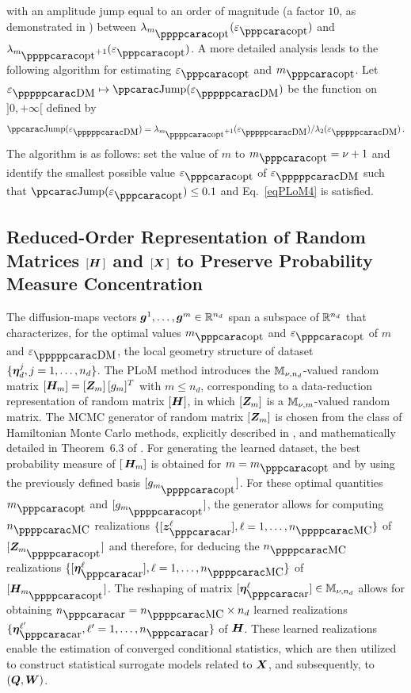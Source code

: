 %
with an amplitude jump equal to an order of magnitude (a factor $10$, as demonstrated in \cite{Soize2020c}) between
$\lambda_{m_\popt}(\varepsilon_\opt)$ and $\lambda_{m_\popt +1}(\varepsilon_\opt)$.
A more detailed analysis leads to the following algorithm for estimating $\varepsilon_\opt$ and $m_\opt$. Let $\varepsilon_\DM\mapsto \Jump(\varepsilon_\DM)$ be the function on $ ] 0 , + \infty [ $ defined by
%
\begin{equation} \label{eqPLoM5}
\Jump(\varepsilon_\DM) = \lambda_{m_\popt+1}(\varepsilon_\DM) / \lambda_2(\varepsilon_\DM) \, .
\end{equation}
%
The algorithm is as follows: set the value of $m$ to $m_\opt = \nu+1$ and identify the smallest possible value $\varepsilon_\opt$ of $\varepsilon_\DM$ such that $\Jump(\varepsilon_\opt) \leq 0.1$ and Eq.~\eqref{eqPLoM4} is satisfied.

\subsection[Reduced-Order Representation of Random Matrices H and X to Preserve Probability Measure Concentration]{Reduced-Order Representation of Random Matrices $[{\boldsymbol{H}}\,]$ and $[{\boldsymbol{X}}\,]$ to Preserve Probability Measure Concentration}
\label{sec:PLoM.4}
%
The diffusion-maps vectors ${\boldsymbol{g}}^{1},\ldots , {\boldsymbol{g}}^{m}\in{\mathbb{R}}^{n_d}$  span a subspace of ${\mathbb{R}}^{n_d}$ that characterizes, for the optimal values $m_\opt$ and $\varepsilon_\opt$ of $m$ and $\varepsilon_\DM$, the local geometry structure of  dataset $\{{\boldsymbol{\eta}}_d^j, j=1,\ldots , n_d\}$. The PLoM method introduces the ${\mathbb{M}}_{\nu,n_d}$-valued random matrix $[{\boldsymbol{H}}_{m}] = [{\boldsymbol{Z}}_{m}]\, [g_{m}]^T$ with $m \leq n_d$, corresponding to a data-reduction representation of random matrix $[{\boldsymbol{H}}]$, in which  $[{\boldsymbol{Z}}_{m}]$ is a ${\mathbb{M}}_{\nu,m}$-valued random matrix. The MCMC generator of random matrix $[{\boldsymbol{Z}}_{m}]$ is chosen from the class of Hamiltonian Monte Carlo methods, explicitly described in \cite{Soize2016}, and  mathematically detailed in Theorem~6.3 of \cite{Soize2020c}. For generating the learned dataset, the best probability measure of $[\,{\boldsymbol{H}}_{m}]$  is obtained for $m = m_\opt$ and by using the previously defined basis $[g_{m_\popt}]$. For these optimal quantities $m_\opt$ and $[g_{m_\popt}]$, the generator allows for computing $n_\MC$ realizations $\{[\bfz_\ar^{\ell}],\ell=1,\ldots , n_\MC\}$ of  $[\bfZ_{m_\popt}]$ and therefore, for deducing the $n_\MC$ realizations $\{[\bfeta_\ar^\ell],\ell=1,\ldots ,n_\MC\}$ of $[\bfH_{m_\popt}]$. The reshaping of matrix $[\bfeta_\ar^\ell] \in \MM_{\nu,n_d}$ allows for obtaining $n_\ar = n_\MC \times n_d$ learned realizations
$\{\bfeta_\ar^{\ell'},\ell' =1,\ldots ,n_\ar\}$ of ${\boldsymbol{H}}$. These learned realizations enable the estimation of converged conditional statistics, which are then utilized to construct statistical surrogate models related to ${\boldsymbol{X}}$, and subsequently, to $({\boldsymbol{Q}},{\boldsymbol{W}})$.

